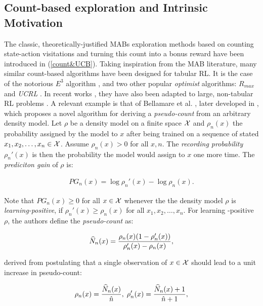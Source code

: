 \subsection{Count-based exploration and Intrinsic Motivation}
The classic, theoretically-justified \gls{MAB}s exploration methods based on counting state-action visitations and turning this count into a bonus reward have been introduced in (\ref{count&UCB}). Taking inspiration from the \gls{MAB} literature, many similar count-based algorithms have been designed for tabular \gls{RL}. It is the case of the notorious $E^3$ algorithm \cite{kearns2002near}, and two other popular \emph{optimist} algorithms: $R_{max}$ \cite{brafman2002r} and \emph{UCRL} \cite{auer2007logarithmic}. 
In recent works \cite{bellemare2016unifying, tang2017exploration, ostrovski2017count, choshen2018dora}, they have also been adapted to large, non-tabular \gls{RL} problems . A relevant example is that of Bellamare et al. \cite{bellemare2016unifying}, later developed in \cite{ostrovski2017count}, which proposes a novel algorithm for deriving a \emph{pseudo-count} from an arbitrary density model.
Let $\rho$ be a density model on a finite space $\mathcal{X}$ and $\rho_n(x)$ the probability assigned by the model to $x$ after being trained on a sequence of stated $x_1,x_2,\dots,x_n\in\mathcal{X}$. Assume $\rho_n(x)>0$ for all $x,n$. The \emph{recording probability} $\rho_n'(x)$ is then the probability the model would assign to $x$ one more time. The \emph{prediciton gain} of $\rho$ is:

\begin{align}
PG_n(x) = \log\rho_n'(x) - \log\rho_n(x).
\end{align}

Note that $PG_n(x)\geq0$ for all $x\in\mathcal{X}$ whenever the the density model $\rho$ is \emph{learning-positive}, \ie if $\rho_n'(x)\geq\rho_n(x)$ for all $x_1,x_2,\dots,x_n$. For learning -positive $\rho$, the authors define the \emph{pseudo-count} as:

\begin{align}
\widehat{N}_n(x) = \frac{\rho_n(x)(1-\rho_n'(x))}{\rho_n'(x)-\rho_n(x)},
\end{align}

derived from postulating that a single observation of $x\in\mathcal{X}$ should lead to a unit increase in pseudo-count:

\begin{align}
\rho_n(x) = \frac{\widehat{N}_n(x)}{\hat{n}}, \; \rho_n'(x) = \frac{\widehat{N}_n(x)+1}{\hat{n}+1},
\end{align}

